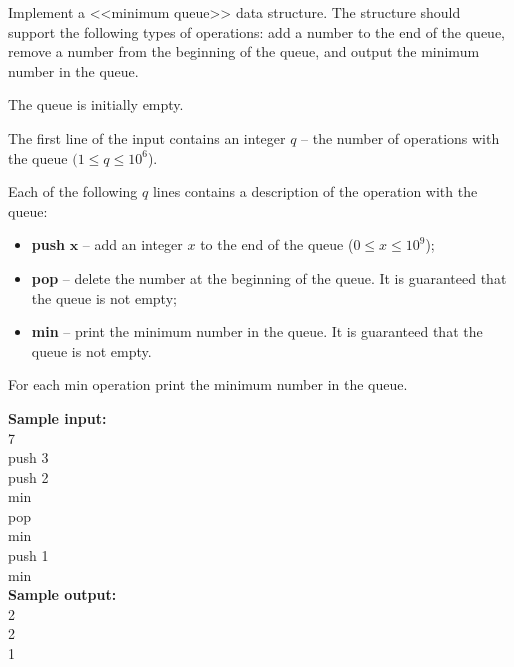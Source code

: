 \documentclass[a4paper]{article}
\begin{document}
Implement a <<minimum queue>> data structure. The structure should support the following types of operations: add a number to the end of the queue, remove a number from the beginning of the queue, and output the minimum number in the queue.

The queue is initially empty.

The first line of the input contains an integer $q$ -- the number of operations with the queue $(1 \le q \le 10^6$).

Each of the following $q$ lines contains a description of the operation with the queue:
\begin{itemize}
\item \textbf{push} $\mathbf{x}$ -- add an integer $x$ to the end of the queue ($0 \le x \le 10^9$);
\item \textbf{pop} -- delete the number at the beginning of the queue. It is guaranteed that the queue is not empty;
\item \textbf{min} -- print the minimum number in the queue. It is guaranteed that the queue is not empty.
\end{itemize}


For each min operation print the minimum number in the queue.

\LINE

\noindent \textbf{Sample input:}\\
7\\
push 3\\
push 2\\
min\\
pop\\
min\\
push 1\\
min\\

\noindent \textbf{Sample output:}\\
2\\
2\\
1\\
\end{document}
